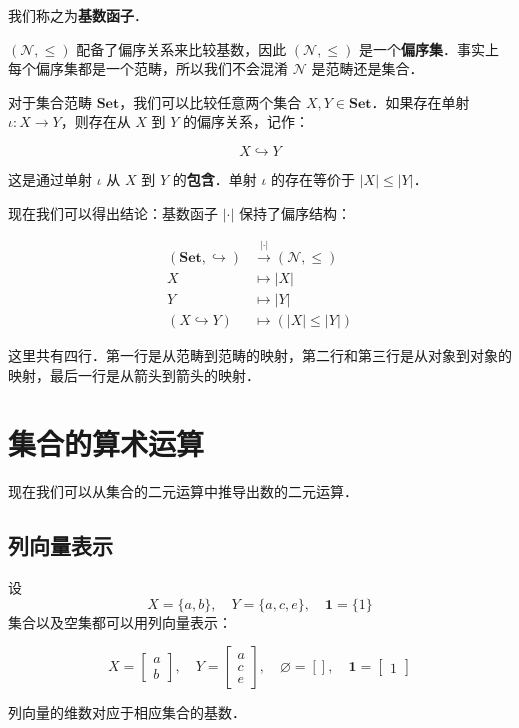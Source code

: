 \documentclass[10pt, openany]{book}
\begin{document}
我们称之为\textbf{基数函子}．

$(\mathcal N,\leq)$ 配备了偏序关系来比较基数，因此 $(\mathcal N,\leq)$ 是一个\textbf{偏序集}．事实上每个偏序集都是一个范畴，所以我们不会混淆 $\mathcal N$ 是范畴还是集合．

对于集合范畴 $\textbf{Set}$，我们可以比较任意两个集合 $X,Y\in\textbf{Set}$．如果存在单射 $\iota: X \to Y$，则存在从 $X$ 到 $Y$ 的偏序关系，记作：

$$
X \hookrightarrow Y
$$

这是通过单射 $\iota$ 从 $X$ 到 $Y$ 的\textbf{包含}．单射 $\iota$ 的存在等价于 $|X| \leq |Y|$．

现在我们可以得出结论：基数函子 $|\cdot|$ 保持了偏序结构：

$$
\begin{aligned}
(\textbf{Set},\hookrightarrow) &\stackrel{|\cdot|}{\longrightarrow}(\mathcal N,\leq) \\
X &\mapsto |X| \\
Y &\mapsto |Y| \\
(X \hookrightarrow Y) &\mapsto (|X| \leq |Y|)
\end{aligned}
$$

这里共有四行．第一行是从范畴到范畴的映射，第二行和第三行是从对象到对象的映射，最后一行是从箭头到箭头的映射．
\chapter{集合的算术运算}

现在我们可以从集合的二元运算中推导出数的二元运算．

\section{列向量表示}

设
\[
X = \{a,b\},\quad Y = \{a,c,e\},\quad \mathbf{1} = \{1\}
\]
集合以及空集都可以用列向量表示：

\[
X = \begin{bmatrix}a\\b\end{bmatrix},\quad 
Y = \begin{bmatrix}a\\c\\e\end{bmatrix},\quad 
\varnothing = [],\quad \mathbf{1} = \begin{bmatrix}1\end{bmatrix}
\]

列向量的维数对应于相应集合的基数．
\end{document}

